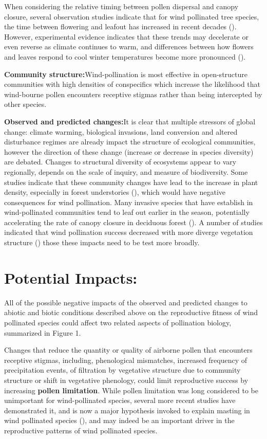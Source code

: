 \documentclass[12pt]{article}
\begin{document}
When considering the relative timing between pollen dispersal and canopy closure, several observation studies indicate that for wind pollinated tree species, the time between flowering and leafout has increased in recent decades (). However, experimental evidence indicates that these trends may decelerate or even reverse as climate continues to warm, and differences between how flowers and leaves respond to cool winter temperatures become more pronounced (). 

\textbf{Community structure:}Wind-pollination is most effective in open-structure communities with high densities of conspecifics which increase the likelihood that wind-bourne pollen encounters receptive stigmas rather than being intercepted by other species. 

\textbf{Observed and predicted changes:}It is clear that multiple stressors of global change: climate warming, biological invasions, land conversion and altered disturbance regimes are already impact the structure of ecological communities, however the direction of these change (increase or decrease in species diversity) are debated. Changes to structural diversity of ecosystems appear to vary regionally, depends on the scale of inquiry, and measure of biodiversity. Some studies indicate that these community changes have lead to the increase in plant density, especially in forest understories (), which would have negative consequences for wind pollination. Many invasive species that have establish in wind-pollinated communities tend to leaf out earlier in the season, potentially accelerating the rate of canopy closure in deciduous forest ().  A number of studies indicated that wind pollination success decreased with more diverge vegetation structure () those these impacts need to be test more broadly. 

\section{Potential Impacts:}
All of the possible negative impacts of the observed and predicted changes to abiotic and biotic conditions described above on the reproductive fitness of wind pollinated species could affect two related aspects of pollination biology, summarized in Figure 1.

Changes that reduce the quantity or quality of airborne pollen that encounters receptive stigmas, including, phenological mismatches, increased frequency of precipitation events, of filtration by vegetative structure due to community structure or shift in vegetative phenology, could limit reproductive success by increasing \textbf{pollen limitation}. While pollen limitation was long considered to be unimportant for wind-pollinated species, several more recent studies have demonstrated it, and is now a major hypothesis invoked to explain masting in wind pollinated species (), and may indeed be an important driver in the reproductive patterns of wind pollinated species.
\end{document}
